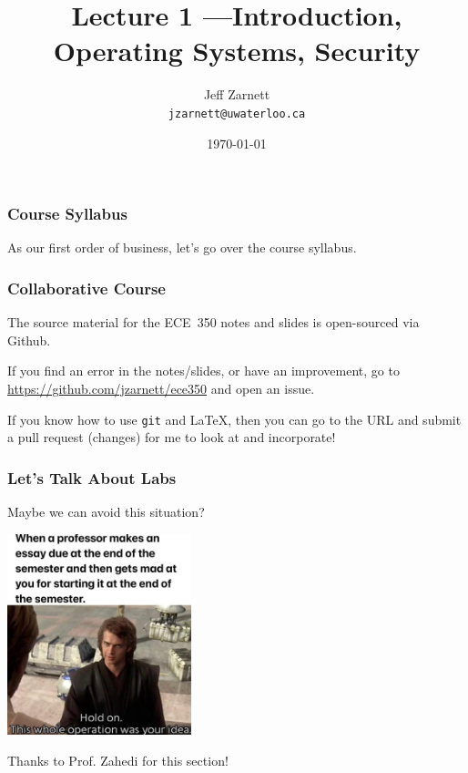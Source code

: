 

\title{Lecture 1 ---Introduction, Operating Systems, Security}

\author{Jeff Zarnett \\ \small \texttt{jzarnett@uwaterloo.ca}}
\date{\today}




\begin{frame}
  \titlepage

 \end{frame}

\begin{frame}
\frametitle{Course Syllabus}

As our first order of business, let's go over the course syllabus.

\end{frame}

\begin{frame}
\frametitle{Collaborative Course}

The source material for the ECE~350 notes and slides is open-sourced via Github. 

If you find an error in the notes/slides, or have an improvement, go to \url{https://github.com/jzarnett/ece350} and open an issue. 

If you know how to use \texttt{git} and \LaTeX, then you can go to the URL and submit a pull request (changes) for me to look at and incorporate!


\end{frame}

\begin{frame}
\frametitle{Let's Talk About Labs}

Maybe we can avoid this situation?

\begin{center}
	\includegraphics[width=0.4\textwidth]{images/youridea.jpg}
\end{center}

Thanks to Prof. Zahedi for this section! 

\end{frame}

